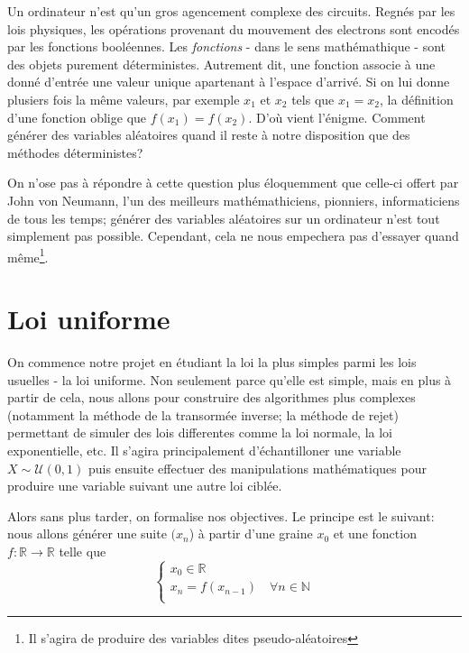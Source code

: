 \documentclass[10pt]{article} %
\begin{document}
Un ordinateur n'est qu'un gros agencement complexe des circuits. Regnés par les lois physiques, les opérations provenant du mouvement des electrons
sont encodés par les fonctions booléennes. Les \textit{fonctions} - dans le sens mathémathique - sont des objets purement déterministes. Autrement dit,
une fonction associe à une donné d'entrée une valeur unique apartenant à l'espace d'arrivé. Si on lui donne plusiers fois la même valeurs, par exemple $x_1$ et $x_2$
tels que $x_1 = x_2$, la définition d'une fonction oblige que $f(x_1) = f(x_2)$. D'où vient l'énigme. Comment générer des variables aléatoires quand il reste à notre
disposition que des méthodes déterministes?

On n'ose pas à répondre à cette question plus éloquemment que celle-ci offert par John von Neumann, l'un des meilleurs mathémathiciens, pionniers, informaticiens de tous les temps; générer des variables aléatoires sur un ordinateur n'est tout simplement pas possible.
Cependant, cela ne nous empechera pas d'essayer quand même\footnote{Il s'agira de produire des variables dites pseudo-aléatoires}.

\section{Loi uniforme}

On commence notre projet en étudiant la loi la plus simples parmi les lois usuelles - la loi uniforme. Non seulement parce qu'elle est simple, mais en plus à partir de cela, nous allons
pour construire des algorithmes plus complexes (notamment la méthode de la transormée inverse; la méthode de rejet) permettant de simuler des
lois differentes comme la loi normale, la loi exponentielle, etc. Il s'agira principalement d'échantilloner une variable $X\sim \mathcal{U}(0, 1)$ puis ensuite effectuer des manipulations
mathématiques pour produire une variable suivant une autre loi ciblée.

Alors sans plus tarder, on formalise nos objectives. Le principe est le suivant: nous allons générer une suite $(x_n$) à partir d'une graine $x_0$ et une fonction $f : \mathbb{R} \longrightarrow \mathbb{R}$ telle que
$$
\left\{
    \begin{array}{ll}
        x_{0} \in \mathbb{R} \\
        x_{n} = f(x_{n - 1})  \quad \forall n \in \mathbb{N} \\
    \end{array}
\right.
$$
\end{document}
